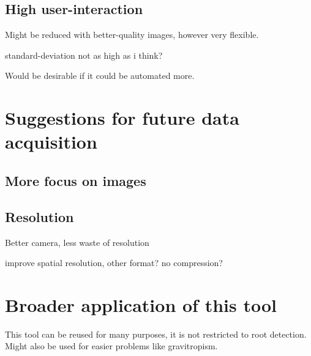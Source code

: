 \subsection{High user-interaction}
Might be reduced with better-quality images, however very flexible.


standard-deviation not as high as i think?

Would be desirable if it could be automated more. 

\section{Suggestions for future data acquisition}


\subsection{More focus on images}


\subsection{Resolution}

Better camera, less waste of resolution

improve spatial resolution, other format? no compression?
 
 
\section{Broader application of this tool}

This tool can be reused for many purposes, it is not restricted to root detection.
Might also be used for easier problems like gravitropism.


